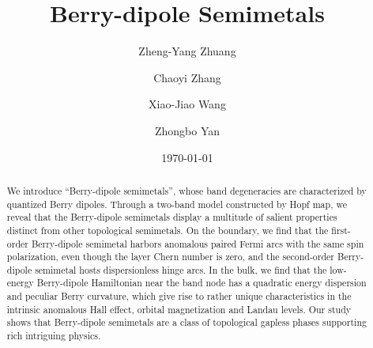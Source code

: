 \documentclass[aps,prl,twocolumn,longbibliography]{revtex4-1}
\begin{document}
\title{Berry-dipole Semimetals}

\author{Zheng-Yang Zhuang}

\author{Chaoyi Zhang}

\author{Xiao-Jiao Wang}


\author{Zhongbo Yan}


\date{\today}

\begin{abstract}
We introduce ``Berry-dipole semimetals'', whose band degeneracies are characterized by quantized
Berry dipoles. Through a two-band model  constructed by Hopf map, we reveal that the Berry-dipole semimetals
display a multitude of salient properties distinct from
other topological semimetals. On the boundary,  we find that
the first-order Berry-dipole semimetal harbors anomalous paired Fermi arcs with the same spin polarization,  even
though the layer Chern number is zero, and the second-order Berry-dipole semimetal hosts dispersionless hinge arcs. In
the bulk, we find that the low-energy Berry-dipole Hamiltonian near the band node has
a quadratic energy dispersion and peculiar Berry curvature, which give rise
to rather unique characteristics in the intrinsic anomalous Hall effect,
orbital magnetization and Landau levels.
Our study shows that Berry-dipole semimetals
are a class of topological gapless phases supporting rich intriguing physics.
\end{abstract}

\maketitle
\end{document}
